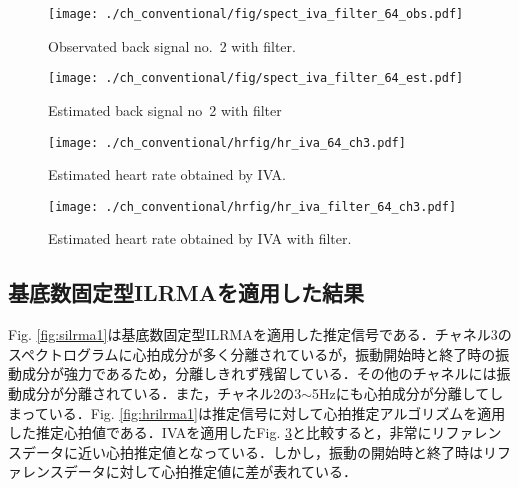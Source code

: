 {%
\begin{figure}[tb]
\centering
\texttt{[image: ./ch\_conventional/fig/spect\_iva\_filter\_64\_obs.pdf]}
\caption{Observated back signal no.~2 with filter.}
\label{fig:sfiva64obs}
\end{figure}

\begin{figure}[tb]
\centering
\texttt{[image: ./ch\_conventional/fig/spect\_iva\_filter\_64\_est.pdf]}
\caption{Estimated back signal no~2 with filter}
\label{fig:sfiva64est}
\end{figure}

\begin{figure}[htbp]
 \begin{minipage}{0.5\hsize}
  \begin{center}
   \texttt{[image: ./ch\_conventional/hrfig/hr\_iva\_64\_ch3.pdf]}
  \end{center}
  \caption{Estimated heart rate obtained by IVA.}
  \label{fig:hriva64ch3}
 \end{minipage}
 \begin{minipage}{0.5\hsize}
  \begin{center}
   \texttt{[image: ./ch\_conventional/hrfig/hr\_iva\_filter\_64\_ch3.pdf]}
  \end{center}
  \caption{Estimated heart rate obtained by IVA with filter.}
  \label{fig:fhriva64ch3}
 \end{minipage}
\end{figure}

\subsection{基底数固定型ILRMAを適用した結果}
\label{sec:conv:resultilrma1}
Fig. \ref{fig:silrma1}は基底数固定型ILRMAを適用した推定信号である．チャネル3のスペクトログラムに心拍成分が多く分離されているが，振動開始時と終了時の振動成分が強力であるため，分離しきれず残留している．その他のチャネルには振動成分が分離されている．また，チャネル2の3$\sim$5Hzにも心拍成分が分離してしまっている．Fig. \ref{fig:hrilrma1}は推定信号に対して心拍推定アルゴリズムを適用した推定心拍値である．IVAを適用したFig. \ref{fig:fhriva64ch3}と比較すると，非常にリファレンスデータに近い心拍推定値となっている．しかし，振動の開始時と終了時はリファレンスデータに対して心拍推定値に差が表れている．

}
